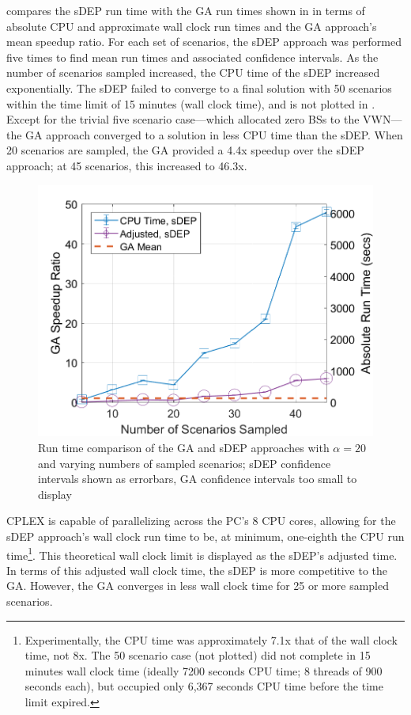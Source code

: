 \documentclass[12pt,dvipsnames]{report}
\begin{document}
 compares the sDEP run time with the GA run times shown in  in terms of absolute CPU and approximate wall clock run times and the GA approach's mean speedup ratio.  For each set of scenarios, the sDEP approach was performed five times to find mean run times and associated confidence intervals.  As the number of scenarios sampled increased, the CPU time of the sDEP increased exponentially.  The sDEP failed to converge to a final solution with 50 scenarios within the time limit of 15 minutes (wall clock time), and is not plotted in .  Except for the trivial five scenario case---which allocated zero BSs to the VWN---the GA approach converged to a solution in less CPU time than the sDEP.  When 20 scenarios are sampled, the GA provided a 4.4x speedup over the sDEP approach; at 45 scenarios, this increased to 46.3x.

\begin{figure}[htp]
	\centering
	\includegraphics[height=0.4\textheight]{Figures/Prelim_VOSGA_SpeedupRatio_AbsComp_alpha20}
	\caption[Preliminary simulation run time comparison of the GA and sDEP approaches with fixed $\alpha$]{Run time comparison of the GA and sDEP approaches with $\alpha = 20$ and varying numbers of sampled scenarios; sDEP confidence intervals shown as errorbars, GA confidence intervals too small to display}
	\label{fig:Prelim_AlgSpeedupRunTime}
\end{figure}

CPLEX is capable of parallelizing across the PC's 8 CPU cores, allowing for the sDEP approach's wall clock run time to be, at minimum, one-eighth the CPU run time\footnote{Experimentally, the CPU time was approximately 7.1x that of the wall clock time, not 8x.  The 50 scenario case (not plotted) did not complete in 15 minutes wall clock time (ideally 7200 seconds CPU time; 8 threads of 900 seconds each), but occupied only 6,367 seconds CPU time before the time limit expired.}.  This theoretical wall clock limit is displayed as the sDEP's adjusted time.  In terms of this adjusted wall clock time, the sDEP is more competitive to the GA.  However, the GA converges in less wall clock time for 25 or more sampled scenarios.
\end{document}
